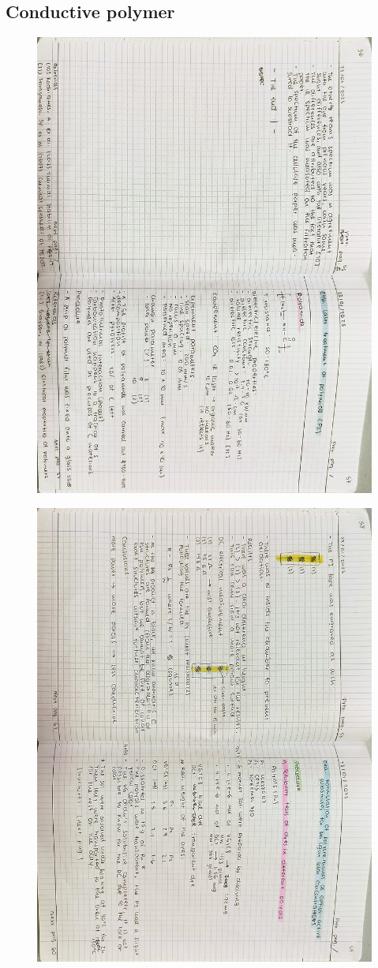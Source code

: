 \subsection{Conductive polymer}
\begin{figure}[H]
	\centering
	\includegraphics[width=0.6\linewidth, angle=90]{../images/compressed/IMG20250123173202.jpg}
\end{figure}
\begin{figure}[H]
	\centering
	\includegraphics[width=0.6\linewidth, angle=90]{../images/compressed/IMG20250123173208.jpg}
\end{figure}
